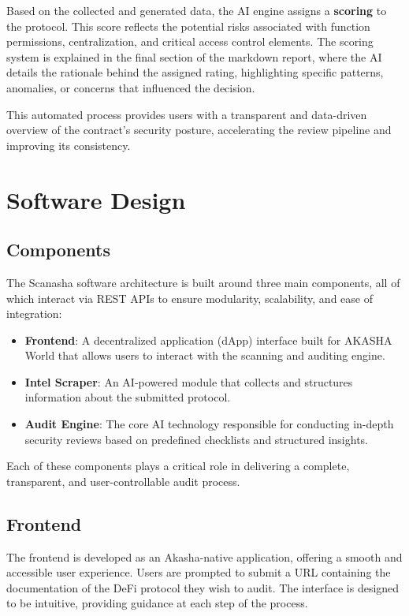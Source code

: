 \documentclass[paper=a4, fontsize=11pt,twoside]{scrartcl}
\begin{document}
	Based on the collected and generated data, the AI engine assigns a \textbf{scoring} to the protocol. This score reflects the potential risks associated with function permissions, centralization, and critical access control elements. The scoring system is explained in the final section of the markdown report, where the AI details the rationale behind the assigned rating, highlighting specific patterns, anomalies, or concerns that influenced the decision.

	This automated process provides users with a transparent and data-driven overview of the contract's security posture, accelerating the review pipeline and improving its consistency.

	\section{Software Design}

	\subsection{Components}

	The Scanasha software architecture is built around three main components, all of which interact via REST APIs to ensure modularity, scalability, and ease of integration:

	\begin{itemize}
		\item \textbf{Frontend}: A decentralized application (dApp) interface built for AKASHA World that allows users to interact with the scanning and auditing engine.
		\item \textbf{Intel Scraper}: An AI-powered module that collects and structures information about the submitted protocol.
		\item \textbf{Audit Engine}: The core AI technology responsible for conducting in-depth security reviews based on predefined checklists and structured insights.
	\end{itemize}

	Each of these components plays a critical role in delivering a complete, transparent, and user-controllable audit process.

	\subsection{Frontend}

	The frontend is developed as an Akasha-native application, offering a smooth and accessible user experience. Users are prompted to submit a URL containing the documentation of the DeFi protocol they wish to audit. The interface is designed to be intuitive, providing guidance at each step of the process.
\end{document}
